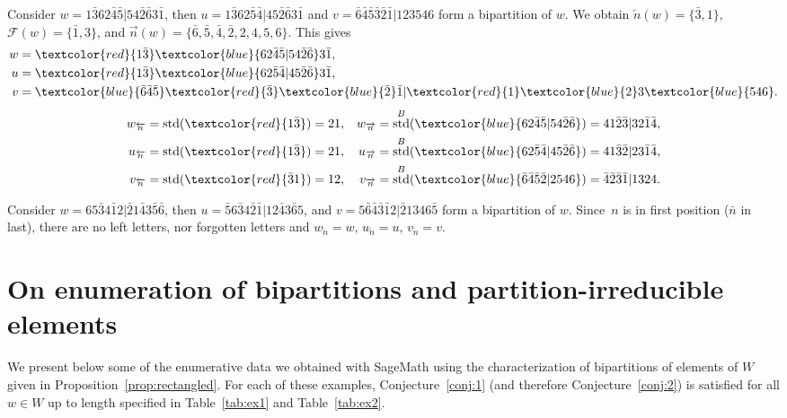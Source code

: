 \documentclass[Unicode]{cedram-alco}
\theoremstyle{definition}
\DeclareMathOperator{\std}{std}
\newcommand{\R}{{\overrightarrow{n}}}
\newcommand{\LL}{{\overleftarrow{n}}}
\newcommand{\Bstd}{\std^{B}}
\newcommand{\F}{\mathcal{F}}
\newcommand{\red}[1]{\textcolor{red}{#1}}
\newcommand{\blue}[1]{\textcolor{blue}{#1}}
\begin{document}
\begin{ex}
\label{ex:typeB-neg1}
Consider $w = 1 \bar{3} 6 2 \bar{4} \bar{5} | 5 4 \bar{2} \bar{6} 3 \bar{1}$, then $u = 1 \bar{3} 6 2 \bar{5} \bar{4} | 4 5 \bar{2} \bar{6} 3 \bar{1}$ and $v = \bar{6} \bar{4} \bar{5} \bar{3} \bar{2} \bar{1} | 1 2 3 5 4 6$ form a bipartition of $w$.  We obtain $\LL(w) = \lbrace \bar{3}, 1 \rbrace$, $\F(w) = \lbrace \bar{1}, 3 \rbrace$, and $\R(w) = \lbrace \bar{6}, \bar{5}, \bar{4}, \bar{2}, 2, 4, 5, 6 \rbrace$. This gives
\begin{align*}
w &= \red{1 \bar{3}} \blue{ 6 2 \bar{4} \bar{5} | 5 4 \bar{2} \bar{6}} 3 \bar{1}, \\
u &= \red{1 \bar{3}} \blue{ 6 2 \bar{5} \bar{4} | 4 5 \bar{2} \bar{6}} 3 \bar{1}, \\
v &= \blue{\bar{6} \bar{4} \bar{5}} \red{\bar{3}} \blue{\bar{2}} \bar{1} | \red{1} \blue{2} 3 \blue{5 4 6}.
\end{align*}
\begin{align*}
w_\LL &= \std(\red{1 \bar{3}}) = 2 1, & w_\R &= \Bstd(\blue{6 2 \bar{4} \bar{5} | 5 4 \bar{2} \bar{6}}) = 4 1 \bar{2} \bar{3} | 3 2 \bar{1} \bar{4}, \\
u_\LL &= \std(\red{1 \bar{3}}) = 2 1, & u_\R &= \Bstd(\blue{6 2 \bar{5} \bar{4} | 4 5 \bar{2} \bar{6}}) = 4 1 \bar{3} \bar{2} | 2 3 \bar{1} \bar{4}, \\
v_\LL &= \std(\red{\bar{3} 1}) = 1 2, & v_\R &= \Bstd(\blue{\bar{6} \bar{4} \bar{5} \bar{2} | 2 5 4 6}) = \bar{4} \bar{2} \bar{3} \bar{1} | 1 3 2 4. 
\end{align*}
\end{ex}

\begin{ex}
\label{ex:typeB-neg2}
Consider $w = 6 5 \bar{3} 4 \bar{1} 2 | \bar{2} 1 \bar{4} 3 \bar{5} \bar{6}$, then $u = \bar{5} 6 \bar{3} 4 \bar{2} \bar{1} | 1 2 \bar{4} 3 \bar{6} 5$, and $v = 5 \bar{6} \bar{4} \bar{3} \bar{1} 2 | \bar{2} 1 3 4 6 \bar{5}$ form a bipartition of $w$.  Since~$n$ is in first position ($\bar{n}$ in last), there are no left letters, nor forgotten letters and $w_\LL = w$, $u_\LL =u$, $v_\LL = v$.
\end{ex}


\section{On  enumeration of bipartitions and partition-irreducible elements}\label{ss:Computations}

We present below some of the enumerative data we obtained with SageMath using the characterization of bipartitions of elements of $W$ given in Proposition~\ref{prop:rectangled}. For each of these examples, Conjecture~\ref{conj:1} (and therefore Conjecture~\ref{conj:2}) is satisfied for all $w\in W$ up to length specified in Table~\ref{tab:ex1} and Table~\ref{tab:ex2}. 
\end{document}
